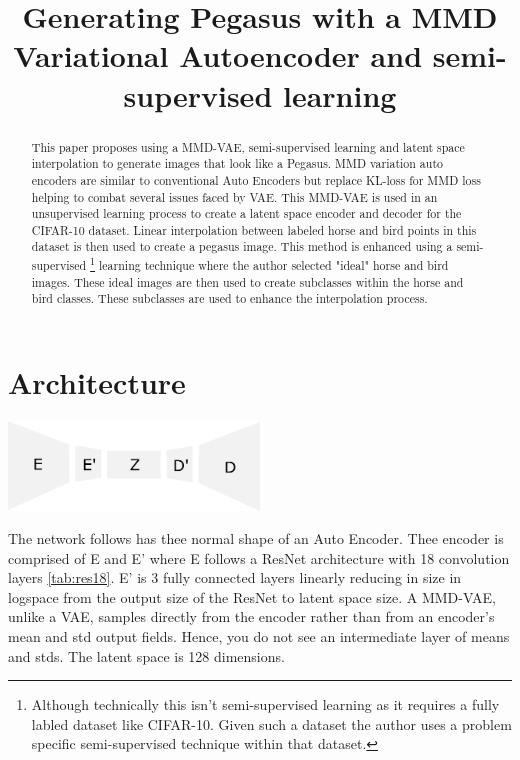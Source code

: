 \documentclass{article}
\title{Generating Pegasus with a MMD Variational Autoencoder and semi-supervised learning}
\begin{document}
\maketitle
\begin{abstract}
    This paper proposes using a MMD-VAE, semi-supervised learning and latent space interpolation to generate images that look like a Pegasus. MMD variation auto encoders are similar to conventional Auto Encoders but replace KL-loss for MMD loss helping to combat several issues faced by VAE. This MMD-VAE is used in an unsupervised learning process to create a latent space encoder and decoder for the CIFAR-10 dataset. Linear interpolation between labeled horse and bird points in this dataset is then used to create a pegasus image. This method is enhanced using a semi-supervised \footnote{Although technically this isn't semi-supervised learning as it requires a fully labled dataset like CIFAR-10. Given such a dataset the author uses a problem specific semi-supervised technique within that dataset.} learning technique where the author selected "ideal" horse and bird images. These ideal images are then used to create subclasses within the horse and bird classes. These subclasses are used to enhance the interpolation process.

\end{abstract}

\section{Architecture}
\begin{center}
    \includegraphics[width=0.5\textwidth]{figures/Encoder.png}
\end{center}
The network follows has thee normal shape of an Auto Encoder.
Thee encoder is comprised of E and E' where E follows a ResNet \cite{ResNet} architecture with 18 convolution layers \ref{tab:res18}. E' is 3 fully connected layers linearly reducing in size in logspace from the output size of the ResNet to latent space size. A MMD-VAE, unlike a VAE, samples directly from the encoder rather than from an encoder's mean and std output fields. Hence, you do not see an intermediate layer of means and stds. The latent space is 128 dimensions. 
\end{document}
